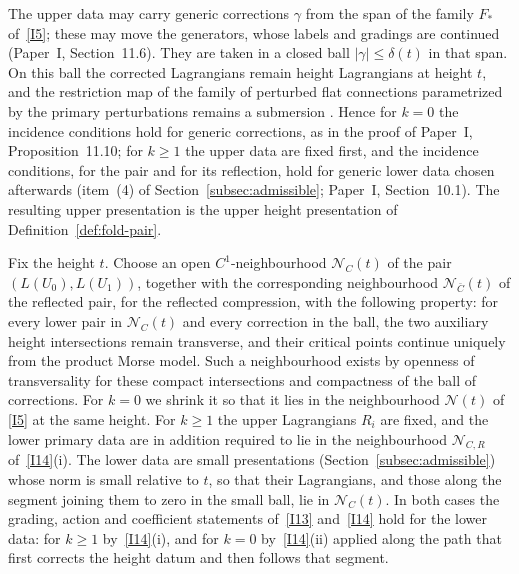 \documentclass[11pt]{amsart}
\theoremstyle{definition}
\theoremstyle{remark}
\theoremstyle{plain}
\numberwithin{equation}{section}
\begin{document}
The upper data may carry generic corrections $\gamma$ from the span of the family $F_*$
of~\ref{I5}; these may move the generators, whose labels and
gradings are continued (Paper~I, Section~11.6). They are taken in a closed ball $|\gamma|\le\delta(t)$
in that span. On this ball the corrected
Lagrangians remain height Lagrangians at height $t$, and the
restriction map of the family of perturbed flat connections
parametrized by the primary perturbations remains a submersion
\cite[Section~2.3]{DFL}. Hence for $k=0$ the incidence conditions
hold for generic corrections, as in the proof of Paper~I,
Proposition~11.10; for $k\ge1$ the upper data are fixed first, and the
incidence conditions, for the pair and for its reflection, hold for
generic lower data chosen afterwards (item~(4) of
Section~\ref{subsec:admissible}; Paper~I, Section~10.1). The resulting upper presentation is
the upper height presentation of Definition~\ref{def:fold-pair}.

Fix the height $t$. Choose an open $C^1$-neighbourhood
$\mathcal N_C(t)$ of the pair $(L(U_0),L(U_1))$, together with the
corresponding neighbourhood $\mathcal N_{\bar C}(t)$ of the reflected pair, for the
reflected compression, with the
following property: for every lower pair in $\mathcal N_C(t)$ and
every correction in the ball, the two auxiliary height intersections
remain transverse, and their critical points continue uniquely from
the product Morse model. Such a neighbourhood exists by openness of
transversality for these compact intersections and compactness of
the ball of corrections. For $k=0$ we shrink it so that it lies in
the neighbourhood $\mathcal N(t)$ of \ref{I5} at the same height. For
$k\ge1$ the upper Lagrangians $R_i$ are fixed, and the lower primary
data are in addition required to lie in the neighbourhood
$\mathcal N_{C,R}$ of~\ref{I14}(i). The lower data are small presentations
(Section~\ref{subsec:admissible}) whose norm is small relative to $t$,
so that their Lagrangians, and those along the segment joining them
to zero in the small ball, lie in $\mathcal N_C(t)$. In both cases
the grading, action and coefficient statements of~\ref{I13}
and~\ref{I14} hold for the lower data: for $k\ge1$ by~\ref{I14}(i),
and for $k=0$ by~\ref{I14}(ii) applied along the path that first corrects the height datum and
then follows that segment.
\end{document}
